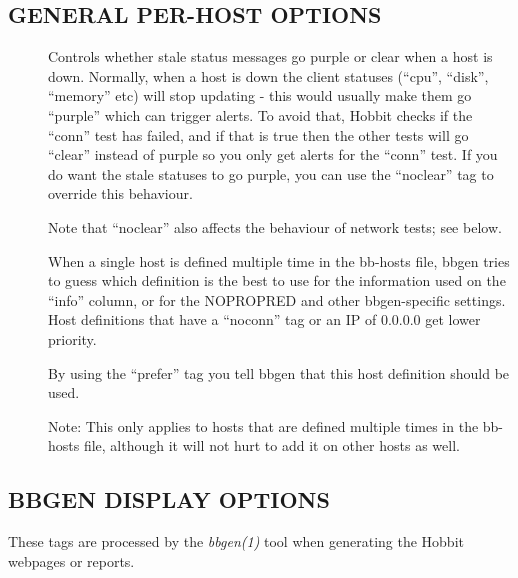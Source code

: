 \subsection{GENERAL PER-HOST OPTIONS }
\begin{description}
\item[] Controls whether stale status messages go purple or
  clear when a host is down. Normally, when a host is down the client
  statuses (``cpu'', ``disk'', ``memory'' etc) will stop updating -
  this would usually make them go ``purple'' which can trigger
  alerts. To avoid that, Hobbit checks if the ``conn'' test has
  failed, and if that is true then the other tests will go ``clear''
  instead of purple so you only get alerts for the ``conn'' test. If
  you do want the stale statuses to go purple, you can use the
  ``noclear'' tag to override this behaviour. 


  Note that ``noclear'' also affects the behaviour of network tests; see below. 


 

\item[] When a single host is defined multiple time in the
  bb-hosts file, bbgen tries to guess which definition is the best to
  use for the information used on the ``info'' column, or for the
  NOPROPRED and other bbgen-specific settings. Host definitions that
  have a ``noconn'' tag or an IP of 0.0.0.0 get lower priority. 


  By using the ``prefer'' tag you tell bbgen that this host definition should be used. 


  Note: This only applies to hosts that are defined multiple times in
  the bb-hosts file, although it will not hurt to add it on other
  hosts as well. 



 
\end{description}
\subsection{BBGEN DISPLAY OPTIONS}
 These tags are processed by the \emph{bbgen(1)}
 tool when generating the Hobbit webpages or reports. 

